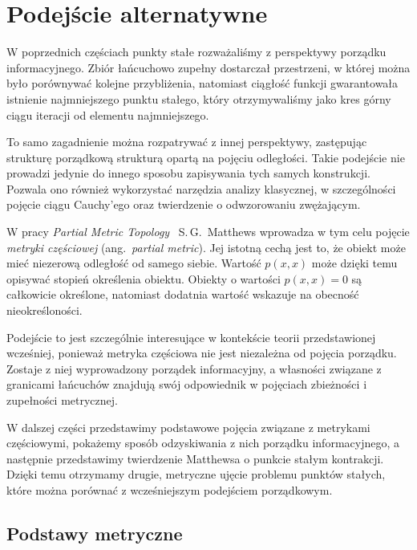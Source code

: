 \documentclass[11pt,a4paper]{article}
\theoremstyle{definition}
\theoremstyle{plain}
\begin{document}
\section{Podejście alternatywne}

W poprzednich częściach punkty stałe rozważaliśmy z perspektywy porządku
informacyjnego. Zbiór łańcuchowo zupełny dostarczał przestrzeni, w której
można było porównywać kolejne przybliżenia, natomiast ciągłość funkcji
gwarantowała istnienie najmniejszego punktu stałego, który otrzymywaliśmy
jako kres górny ciągu iteracji od elementu najmniejszego.

To samo zagadnienie można rozpatrywać z innej perspektywy, zastępując
strukturę porządkową strukturą opartą na pojęciu odległości. Takie podejście
nie prowadzi jedynie do innego sposobu zapisywania tych samych konstrukcji.
Pozwala ono również wykorzystać narzędzia analizy klasycznej, w szczególności
pojęcie ciągu Cauchy'ego oraz twierdzenie o odwzorowaniu zwężającym.

W pracy \emph{Partial Metric Topology}~\cite{matthews1994}
S.\,G.~Matthews wprowadza w tym celu pojęcie \emph{metryki częściowej}
(ang.\ \emph{partial metric}). Jej istotną cechą jest to, że obiekt może mieć
niezerową odległość od samego siebie. Wartość $p(x,x)$ może dzięki temu
opisywać stopień określenia obiektu. Obiekty o wartości $p(x,x)=0$ są
całkowicie określone, natomiast dodatnia wartość wskazuje na obecność
nieokreśloności.

Podejście to jest szczególnie interesujące w kontekście teorii przedstawionej
wcześniej, ponieważ metryka częściowa nie jest niezależna od pojęcia
porządku. Zostaje z niej wyprowadzony porządek informacyjny, a własności
związane z granicami łańcuchów znajdują swój odpowiednik w pojęciach
zbieżności i zupełności metrycznej.

W dalszej części przedstawimy podstawowe pojęcia związane z metrykami
częściowymi, pokażemy sposób odzyskiwania z nich porządku informacyjnego,
a następnie przedstawimy twierdzenie Matthewsa o punkcie stałym kontrakcji.
Dzięki temu otrzymamy drugie, metryczne ujęcie problemu punktów stałych,
które można porównać z wcześniejszym podejściem porządkowym.

\subsection{Podstawy metryczne}
\end{document}
